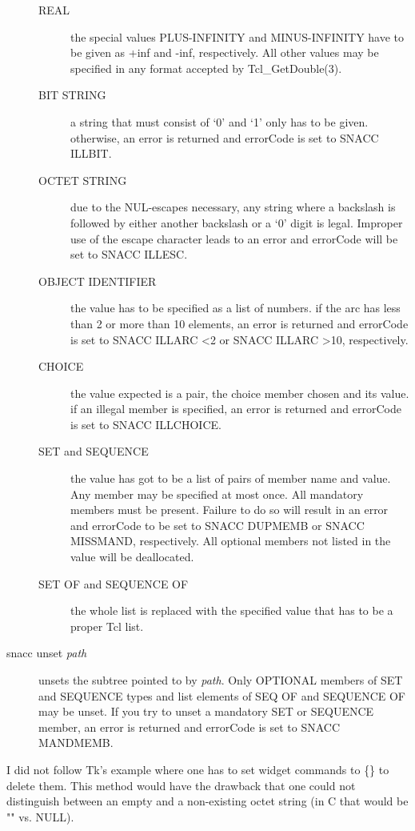 \begin{description}
\begin{description}
      \item[REAL]
	the special values {\ASN PLUS-INFINITY} and {\ASN MINUS-INFINITY} have to be given as {\Tcl +inf} and {\Tcl -inf}, respectively.
	All other values may be specified in any format accepted by {\C Tcl\_GetDouble}(3).
      \item[BIT STRING]
	a string that must consist of `0' and `1' only has to be given.
	otherwise, an error is returned and {\Tcl errorCode} is set to {\Tcl SNACC ILLBIT}.
      \item[OCTET STRING]
	due to the NUL-escapes necessary, any string where a backslash is followed by either another backslash or a `0' digit is legal.
	Improper use of the escape character leads to an error and {\Tcl errorCode} will be set to {\Tcl SNACC ILLESC}.
      \item[OBJECT IDENTIFIER]
	the value has to be specified as a list of numbers.
	if the arc has less than 2 or more than 10 elements, an error is returned and {\Tcl errorCode} is set to {\Tcl SNACC ILLARC <2} or {\Tcl SNACC ILLARC >10}, respectively.
      \item[CHOICE]
	the value expected is a pair, the choice member chosen and its value.
	if an illegal member is specified, an error is returned and {\Tcl errorCode} is set to {\Tcl SNACC ILLCHOICE}.
      \item[SET \textnormal{and} SEQUENCE]
	the value has got to be a list of pairs of member name and value.
	Any member may be specified at most once.
	All mandatory members must be present.
	Failure to do so will result in an error and {\Tcl errorCode} to be set to {\Tcl SNACC DUPMEMB} or {\Tcl SNACC MISSMAND}, respectively.
	All optional members not listed in the value will be deallocated.
      \item[SET OF \textnormal{and} SEQUENCE OF]
	the whole list is replaced with the specified value that has to be a proper Tcl list.
    \end{description}%
  \item[{\Tcl snacc unset \emph{path}}]
    unsets the subtree pointed to by \emph{path}.
    Only OPTIONAL members of SET and SEQUENCE types and list elements of SEQ OF and SEQUENCE OF may be unset.
    If you try to unset a mandatory SET or SEQUENCE member, an error is returned and {\Tcl errorCode} is set to {\Tcl SNACC MANDMEMB}.
\end{description}%

I did not follow Tk's example where one has to set widget commands to {\Tcl \{\}} to delete them.
This method would have the drawback that one could not distinguish between an empty and a non-existing octet string (in C that would be {\C ""} vs. {\C NULL}).

